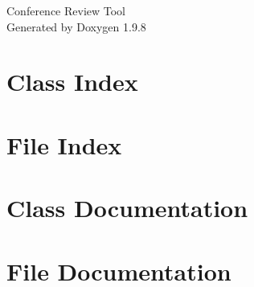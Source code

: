 \documentclass[twoside]{book}
\newcommand{\+}{\discretionary{\mbox{\scriptsize$\hookleftarrow$}}{}{}}
\newcommand{\clearemptydoublepage}{%
    \newpage{\pagestyle{empty}\cleardoublepage}%
  }
\begin{document}
  \raggedbottom
    \hypersetup{pageanchor=false,
                bookmarksnumbered=true,
                pdfencoding=unicode
               }
  \begin{titlepage}
  \vspace*{7cm}
  \begin{center}%
  {\Large Conference Review Tool}\\
  \vspace*{1cm}
  {\large Generated by Doxygen 1.9.8}\\
  \end{center}
  \end{titlepage}
  \clearemptydoublepage
  \tableofcontents
  \clearemptydoublepage
  \hypersetup{pageanchor=true}



\chapter{Class Index}

\chapter{File Index}

\chapter{Class Documentation}












\chapter{File Documentation}







  \backmatter
  \newpage
  \clearemptydoublepage
  \printindex
\end{document}
